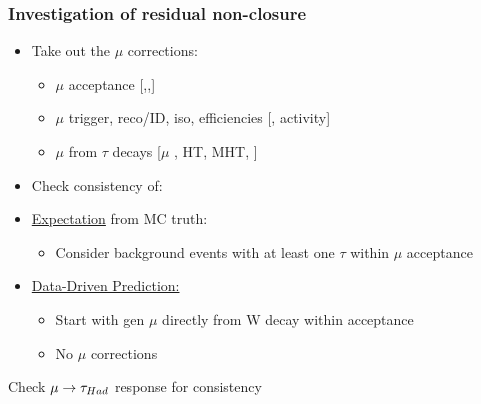 \documentclass{beamer}
\begin{document}
\begin{frame}
 \frametitle{Investigation of residual non-closure}
 \begin{itemize}
  \item Take out the $\mu$ corrections:
  \begin{itemize}
   \item $\mu$ acceptance [\HT,\MHT,\NJets]
   \item $\mu$ trigger, reco/ID, iso, efficiencies [\pt, activity]
   \item $\mu$ from $\tau$ decays [$\mu$ \pt, HT, MHT, \NJets]
  \end{itemize}
  \item Check consistency of:
  \item \uline{Expectation} from MC truth:
  \begin{itemize}
   \item Consider \hadtau background events with at least one $\tau$ within $\mu$ acceptance
  \end{itemize}
  \item \uline{Data-Driven Prediction:}
  \begin{itemize}
   \item Start with gen $\mu$ directly from W decay within acceptance
   \item No $\mu$ corrections
  \end{itemize}
 \end{itemize}
 \begin{block}{}
 \centering
 \Large Check $\mu\rightarrow\tau_{Had}$ response for consistency
 \end{block}
\end{frame}
\end{document}
